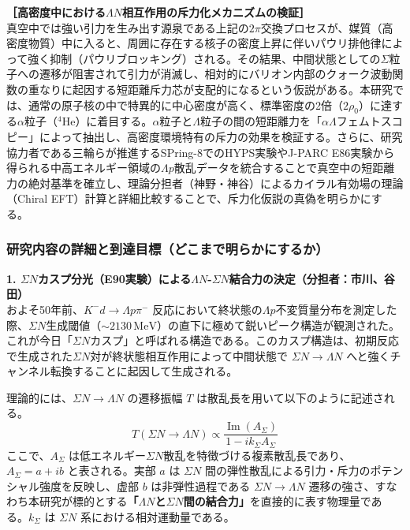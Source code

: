 \documentclass[11pt,a4j,dvipdfmx]{jarticle} 					%
\newcommand{\研究課題名}{加速器実験による短距離バリオン間相互作用の解明と中性子星ハイペロンパズルの解決}
\newcommand{\研究機関名}{東北大学}
\newcommand{\研究代表者氏名}{市川裕大}
\newcommand{\研究期間の最終元号年度}{13}  %
\begin{document}
\noindent
\textbf{［高密度中における$\Lambda N$相互作用の斥力化メカニズムの検証］}\\
真空中では強い引力を生み出す源泉である上記の$2\pi$交換プロセスが、媒質（高密度物質）中に入ると、周囲に存在する核子の密度上昇に伴いパウリ排他律によって強く抑制（パウリブロッキング）される。その結果、中間状態としての$\Sigma$粒子への遷移が阻害されて引力が消滅し、相対的にバリオン内部のクォーク波動関数の重なりに起因する短距離斥力芯が支配的になるという仮説がある。本研究では、通常の原子核の中で特異的に中心密度が高く、標準密度の2倍（$2\rho_0$）に達する$\alpha$粒子（${}^4\mathrm{He}$）に着目する。$\alpha$粒子と$\Lambda$粒子の間の短距離力を「$\alpha\Lambda$フェムトスコピー」によって抽出し、高密度環境特有の斥力の効果を検証する。さらに、研究協力者である三輪らが推進するSPring-8でのHYPS実験やJ-PARC E86実験から得られる中高エネルギー領域の$\Lambda p$散乱データを統合することで真空中の短距離力の絶対基準を確立し、理論分担者（神野・神谷）によるカイラル有効場の理論（Chiral EFT）計算と詳細比較することで、斥力化仮説の真偽を明らかにする。

\subsubsection{研究内容の詳細と到達目標（どこまで明らかにするか）}

\noindent
\textbf{1. $\Sigma N$カスプ分光（E90実験）による$\Lambda N$-$\Sigma N$結合力の決定（分担者：市川、谷田）}\\
およそ50年前、$K^- d \to \Lambda p \pi^-$ 反応において終状態の$\Lambda p$不変質量分布を測定した際、$\Sigma N$生成閾値（$\sim 2130\,\text{MeV}$）の直下に極めて鋭いピーク構造が観測された。これが今日「$\Sigma N$カスプ」と呼ばれる構造である。このカスプ構造は、初期反応で生成された$\Sigma N$対が終状態相互作用によって中間状態で $\Sigma N \to \Lambda N$ へと強くチャンネル転換することに起因して生成される。

理論的には、$\Sigma N \to \Lambda N$ の遷移振幅 $T$ は散乱長を用いて以下のように記述される。
\begin{equation}
    T(\Sigma N \to \Lambda N) \propto \frac{\operatorname{Im}(A_\Sigma)}{1 - i k_\Sigma A_\Sigma}
\end{equation}
ここで、$A_\Sigma$ は低エネルギー$\Sigma N$散乱を特徴づける複素散乱長であり、$A_\Sigma = a + i b$ と表される。実部 $a$ は $\Sigma N$ 間の弾性散乱による引力・斥力のポテンシャル強度を反映し、虚部 $b$ は非弾性過程である $\Sigma N \to \Lambda N$ 遷移の強さ、すなわち本研究が標的とする\textbf{「$\Lambda N$と$\Sigma N$間の結合力」}を直接的に表す物理量である。$k_\Sigma$ は $\Sigma N$ 系における相対運動量である。
\end{document}
